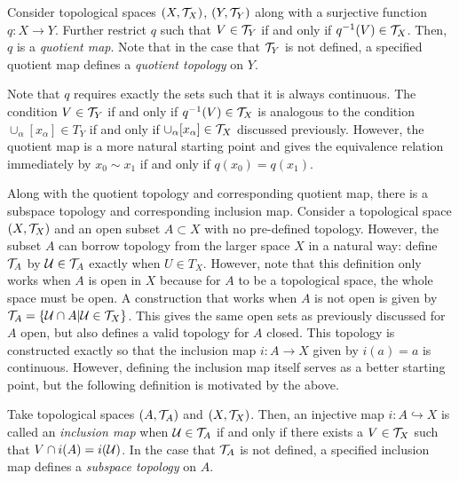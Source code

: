 \documentclass[../sean_thesis.tex]{subfiles}
\begin{document}
\begin{definition}
	Consider topological spaces $(X, \mathcal{T}_X)$, $(Y, \mathcal{T}_Y)$ along with a surjective function $q: X \to Y$. Further restrict $q$ such that $V \in \mathcal{T}_Y$ if and only if $q^{-1}(V) \in \mathcal{T}_X$. Then, $q$ is a \emph{quotient map}. Note that in the case that $\mathcal{T}_Y$ is not defined, a specified quotient map defines a \emph{quotient topology} on $Y$.
\end{definition}

Note that $q$ requires exactly the sets such that it is always continuous. The condition $V \in \mathcal{T}_Y$ if and only if $q^{-1}(V) \in \mathcal{T}_X$ is analogous to the condition $\cup_\alpha [x_\alpha] \in T_Y$ if and only if $\cup_\alpha [x_\alpha] \in \mathcal{T}_X$ discussed previously. However, the quotient map is a more natural starting point and gives the equivalence relation immediately by $x_0 \sim x_1$ if and only if $q(x_0) = q(x_1)$.


Along with the quotient topology and corresponding quotient map, there is a subspace topology and corresponding inclusion map. Consider a topological space $(X,\mathcal{T}_X)$ and an open subset $A \subset X$ with no pre-defined topology. However, the subset $A$ can borrow topology from the larger space $X$ in a natural way: define $\mathcal{T}_A$ by $\mathcal{U} \in \mathcal{T}_A$ exactly when $U \in T_X$. However, note that this definition only works when $A$ is open in $X$ because for $A$ to be a topological space, the whole space must be open. A construction that works when $A$ is not open is given by $\mathcal{T}_A = \{ \mathcal{U} \cap A \vert \mathcal{U} \in \mathcal{T}_X \}$. This gives the same open sets as previously discussed for $A$ open, but also defines a valid topology for $A$ closed. This topology is constructed exactly so that the inclusion map $i: A \to X$ given by $i(a) = a$ is continuous. However, defining the inclusion map itself serves as a better starting point, but the following definition is motivated by the above.

\begin{definition}
	Take topological spaces $(A, \mathcal{T}_A)$ and $(X,\mathcal{T}_X)$. Then, an injective map $i: A \hookrightarrow X$ is called an \emph{inclusion map} when $\mathcal{U} \in \mathcal{T}_A$ if and only if there exists a $V \in \mathcal{T}_X$ such that $V \cap i(A) = i(\mathcal{U})$. In the case that $\mathcal{T}_A$ is not defined, a specified inclusion map defines a \emph{subspace topology} on $A$.
\end{definition}
\end{document}
